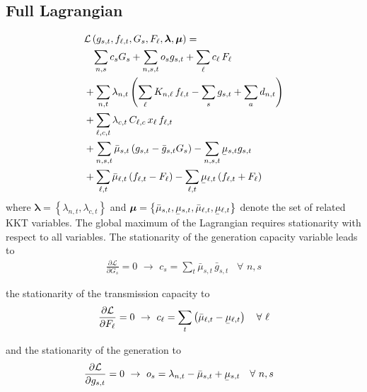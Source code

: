 \documentclass[11pt,twocolumn]{article}
\newcommand{\ubar}[1]{\underaccent{\bar}{#1}}
\newcommand{\Forall}[1]{\hspace{10pt} \forall \,\, #1 }
\newcommand{\pdv}[2]{\frac{\partial #1}{\partial #2}}
\newcommand{\generation}{g_{s,t}}
\newcommand{\generationpotential}{\bar{g}_{s,t}}
\newcommand{\capacityGeneration}{G_{s}}
\newcommand{\capacityFlow}{F_{\ell}}
\newcommand{\capexGeneration}{c_{s}}
\newcommand{\capexFlow}{c_{\ell}}
\newcommand{\opexGeneration}{o_{s}}
\newcommand{\demand}[1][n]{d_{#1,t}}
\newcommand{\incidence}[1][n]{K_{#1,\ell}}
\newcommand{\mulowergeneration}{\ubar{\mu}_{s,t}}
\newcommand{\muuppergeneration}{\bar{\mu}_{s,t}}
\newcommand{\mulowerflow}{\ubar{\mu}_{\ell,t}}
\newcommand{\muupperflow}{\bar{\mu}_{\ell,t}}
\newcommand{\lmp}[1][n]{\lambda_{#1,t}}
\newcommand{\flow}{f_{\ell,t}}
\newcommand{\cycle}{C_{\ell,c}}
\newcommand{\impedance}{x_\ell}
\newcommand{\cycleprice}{\lambda_{c,t}}
\newcommand{\lagrangian}{\mathcal{L}}
\begin{document}
\subsection{Full Lagrangian}
\label{sec:full_lagrangian}
\begin{align}
\notag
& \lagrangian\left(\generation, \flow, \capacityGeneration, \capacityFlow, \boldsymbol{\lambda}, \boldsymbol{\mu} \right)   =   \\  
\notag
& \;\;\; \sum_{n,s} \capexGeneration \capacityGeneration + \sum_{n, s, t} \opexGeneration \generation + \sum_{\ell} \capexFlow \, \capacityFlow  \\
\notag
&+ \sum_{n,t} \lmp \left(\sum_\ell \incidence \, \flow  - \sum_s \generation + \sum_a \demand  \right)  \\ 
\notag
&+ \sum_{\ell,c,t} \cycleprice \, \cycle \, \impedance \, \flow  \\
\notag
&+ \sum_{n,s,t} \muuppergeneration \left( \generation - \generationpotential \capacityGeneration \right)  - \sum_{n,s,t} \mulowergeneration \generation  \\
&+ \sum_{\ell,t} \muupperflow \left( \flow - \capacityFlow \right) - \sum_{\ell,t} \mulowerflow \left( \flow + \capacityFlow \right)     
\label{eq:full_lagrangian}
\end{align}
% 
where $\boldsymbol{\lambda} = \left\lbrace \lmp, \cycleprice \right\rbrace $ and $\boldsymbol{\mu} = \left\lbrace \muuppergeneration, \mulowergeneration, \muupperflow, \mulowerflow \right\rbrace $ denote the set of related KKT variables. The global maximum of the Lagrangian requires stationarity with respect to all variables. The stationarity of the generation capacity variable leads to 
\begin{align}
\pdv{\lagrangian}{\capacityGeneration}  = 0 \,\, \rightarrow \,\, 
\capexGeneration =  \sum_t \muuppergeneration \, \generationpotential  \Forall{n,s}
\label{eq:capexGeneration_duality}
\end{align}

the stationarity of the transmission capacity to
\begin{align}
\pdv{\lagrangian}{\capacityFlow} = 0 \,\, \rightarrow \,\, 
\capexFlow =  \sum_t \left( \muupperflow - \mulowerflow \right) \Forall{\ell}
\label{eq:capexFlow_duality}
\end{align}


and the stationarity of the generation to 
\begin{align}
\pdv{\lagrangian}{\generation} &= 0 \,\, \rightarrow \,\,  
\opexGeneration =  \lmp - \muuppergeneration + \mulowergeneration \Forall{n,s} \label{eq:opex_duality}
\end{align}
\end{document}
